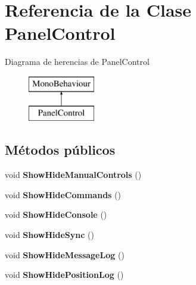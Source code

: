 \hypertarget{class_panel_control}{}\section{Referencia de la Clase Panel\+Control}
\label{class_panel_control}
Diagrama de herencias de Panel\+Control\begin{figure}[H]
\begin{center}
\leavevmode
\includegraphics[height=2.000000cm]{class_panel_control}
\end{center}
\end{figure}
\subsection*{Métodos públicos}
\begin{DoxyCompactItemize}
\item 
\mbox{\label{class_panel_control_a1507903dbb7f0b7f49cb74b4b77247b2}} 
void {\bfseries Show\+Hide\+Manual\+Controls} ()
\item 
\mbox{\label{class_panel_control_ad1245999af785ac0aa3af3f1a6f40900}} 
void {\bfseries Show\+Hide\+Commands} ()
\item 
\mbox{\label{class_panel_control_a2890c74bb81afa4e93e6d698ae5f5721}} 
void {\bfseries Show\+Hide\+Console} ()
\item 
\mbox{\label{class_panel_control_a745d60a4ef5ace7f7691418081db8f94}} 
void {\bfseries Show\+Hide\+Sync} ()
\item 
\mbox{\label{class_panel_control_abd20147e23935b9f87a0b4508a2078c6}} 
void {\bfseries Show\+Hide\+Message\+Log} ()
\item 
\mbox{\label{class_panel_control_a5a25252b29b3ba097cc79778c42c469a}} 
void {\bfseries Show\+Hide\+Position\+Log} ()
\end{DoxyCompactItemize}
